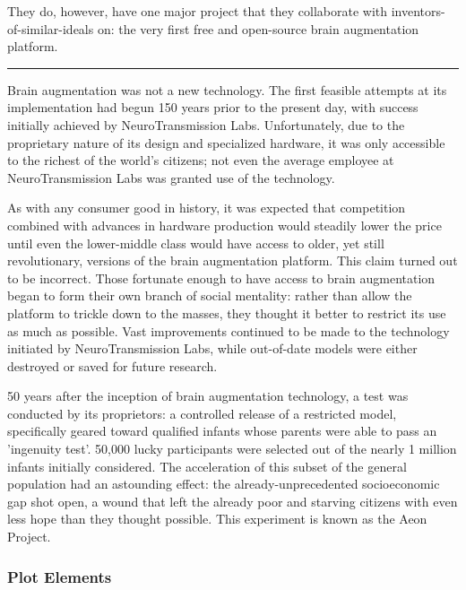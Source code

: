 \documentclass[12pt,titlepage]{article}
\newcommand\sep{\rule{2.5in}{0.1mm}}
\begin{document}
They do, however, have one major project that they collaborate with
inventors-of-similar-ideals on: the very first free and open-source brain
augmentation platform.

\sep

Brain augmentation was not a new technology. The first feasible attempts at its
implementation had begun 150 years prior to the present day, with success
initially achieved by NeuroTransmission Labs. Unfortunately, due to the
proprietary nature of its design and specialized hardware, it was only
accessible to the richest of the world's citizens; not even the average employee
at NeuroTransmission Labs was granted use of the technology.

As with any consumer good in history, it was expected that competition combined
with advances in hardware production would steadily lower the price until even
the lower-middle class would have access to older, yet still revolutionary,
versions of the brain augmentation platform. This claim turned out to be
incorrect. Those fortunate enough to have access to brain augmentation began to
form their own branch of social mentality: rather than allow the platform to
trickle down to the masses, they thought it better to restrict its use as much
as possible. Vast improvements continued to be made to the technology initiated
by NeuroTransmission Labs, while out-of-date models were either destroyed or
saved for future research.

50 years after the inception of brain augmentation technology, a test was
conducted by its proprietors: a controlled release of a restricted model,
specifically geared toward qualified infants whose parents were able to pass an
'ingenuity test'. 50,000 lucky participants were selected out of the nearly 1
million infants initially considered. The acceleration of this subset of the
general population had an astounding effect: the already-unprecedented
socioeconomic gap shot open, a wound that left the already poor and starving
citizens with even less hope than they thought possible. This experiment is
known as the Aeon Project.

\subsubsection{Plot Elements}
\end{document}
